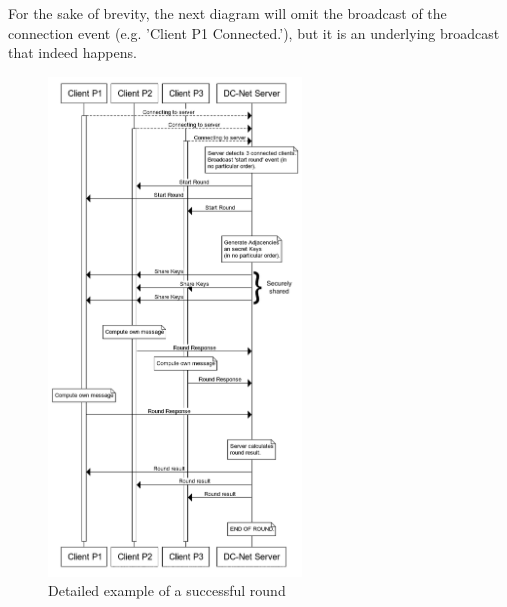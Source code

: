 For the sake of brevity, the next diagram will omit the broadcast of the connection event (e.g. 'Client P1 Connected.'), but it is an underlying broadcast that indeed happens.


\begin{figure}[H]
    \centering
    \includegraphics[width=0.6\textwidth]{Images/Design/successfulRound.png}
    \caption{Detailed example of a successful round}
    \label{fig:successfulRound}
\end{figure}

